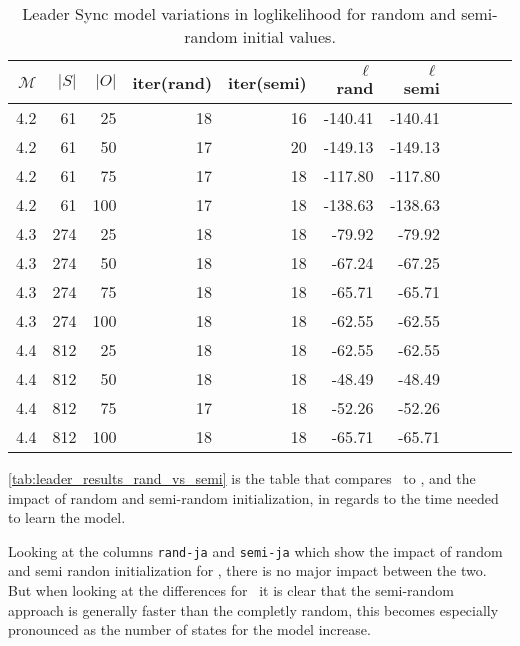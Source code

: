 \begin{table}[htb!]
    \centering
    \caption{Leader Sync model variations in loglikelihood for random and semi-random initial values.}
    \label{tab:leader_results_loglikelihood}
    \begin{tabular}{rrrrrrrrrrr}
        \toprule
        $\mathcal{M}$ & $|S|$ & $|O|$ & iter(rand) & iter(semi) & $\ell$ rand & $\ell$ semi \\
        \midrule
        4.2           & 61    & 25    & 18         & 16         & -140.41     & -140.41     \\
        4.2           & 61    & 50    & 17         & 20         & -149.13     & -149.13     \\
        4.2           & 61    & 75    & 17         & 18         & -117.80     & -117.80     \\
        4.2           & 61    & 100   & 17         & 18         & -138.63     & -138.63     \\
        4.3           & 274   & 25    & 18         & 18         & -79.92      & -79.92      \\
        4.3           & 274   & 50    & 18         & 18         & -67.24      & -67.25      \\
        4.3           & 274   & 75    & 18         & 18         & -65.71      & -65.71      \\
        4.3           & 274   & 100   & 18         & 18         & -62.55      & -62.55      \\
        4.4           & 812   & 25    & 18         & 18         & -62.55      & -62.55      \\
        4.4           & 812   & 50    & 18         & 18         & -48.49      & -48.49      \\
        4.4           & 812   & 75    & 17         & 18         & -52.26      & -52.26      \\
        4.4           & 812   & 100   & 18         & 18         & -65.71      & -65.71      \\
        \bottomrule
    \end{tabular}
\end{table}

\autoref{tab:leader_results_rand_vs_semi} is the table that compares \Cupaal\ to \Jajapy, and the impact of random and semi-random initialization, in regards to the time needed to learn the model.

Looking at the columns \texttt{rand-ja} and \texttt{semi-ja} which show the impact of random and semi randon initialization for \Jajapy, there is no major impact between the two.
But when looking at the differences for \Cupaal\ it is clear that the semi-random approach is generally faster than the completly random, this becomes especially pronounced as the number of states for the model increase.

